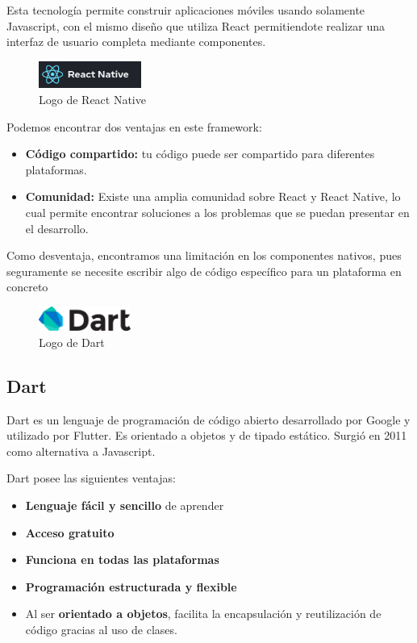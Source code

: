 Esta tecnología permite construir aplicaciones móviles usando solamente Javascript, con el mismo diseño que utiliza
React permitiendote realizar una interfaz de usuario completa mediante componentes. 


\begin{figure}[H]
\centering
\includegraphics[width=0.3\textwidth]{imagenes/c2/reactnative.png}
\caption{Logo de React Native}
\end{figure}


Podemos encontrar dos ventajas en este framework:

\begin{itemize}
\item \textbf{Código compartido:} tu código puede ser compartido para diferentes plataformas.
\item \textbf{Comunidad:} Existe una amplia comunidad sobre React y React Native, lo cual permite encontrar soluciones a los problemas que se puedan presentar en el desarrollo.
\end {itemize}

Como desventaja, encontramos una limitación en los componentes nativos, pues seguramente se necesite escribir algo de código
específico para un plataforma en concreto


\begin{figure}
    \vspace*{-0.4cm}

    \centering
    \includegraphics[width=0.27\textwidth]{imagenes/c2/dart.png}
    \caption{Logo de Dart}
\end{figure}\subsection{Dart}
Dart es un lenguaje de programación de código abierto desarrollado por Google y utilizado por Flutter.
Es orientado a objetos y de tipado estático. Surgió en 2011 como alternativa a Javascript.

Dart posee las siguientes ventajas:

\begin{itemize}
\item \textbf{Lenguaje fácil y sencillo} de aprender
\item \textbf{Acceso gratuito}
\item \textbf{Funciona en todas las plataformas}
\item \textbf{Programación estructurada y flexible}
\item Al ser \textbf{orientado a objetos}, facilita la encapsulación y reutilización de código gracias al uso de clases.
 
\end{itemize}

